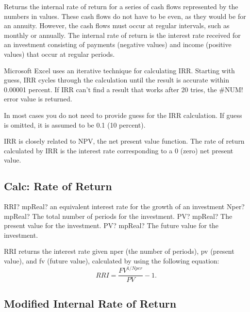 \vspace{0.3cm}
Returns the internal rate of return for a series of cash flows represented by the numbers in values. These cash flows do not have to be even, as they would be for an annuity. However, the cash flows must occur at regular intervals, such as monthly or annually. The internal rate of return is the interest rate received for an investment consisting of payments (negative values) and income (positive values) that occur at regular periods.

Microsoft Excel uses an iterative technique for calculating IRR. Starting with guess, IRR cycles through the calculation until the result is accurate within 0.00001 percent. If IRR can't find a result that works after 20 tries, the \#NUM! error value is returned.

In most cases you do not need to provide guess for the IRR calculation. If guess is omitted, it is assumed to be 0.1 (10 percent).


IRR is closely related to NPV, the net present value function. The rate of return calculated by IRR is the interest rate corresponding to a 0 (zero) net present value.


\subsection{Calc: Rate of Return}

\begin{mpFunctionsExtract}
	\mpWorksheetFunctionThreeNotImplemented
	{RRI? mpReal? an equivalent interest rate for the growth of an investment}
	{Nper? mpReal? The total number of periods for the investment.}
	{PV? mpReal? The present value for the investment.}
	{PV? mpReal? The future value for the investment.}
\end{mpFunctionsExtract}


\vspace{0.3cm}
RRI returns the interest rate given nper (the number of periods), pv (present value), and fv (future value), calculated by using the following equation:
\begin{equation}
	RRI = \frac{FV^{1/Nper}}{PV}-1.
\end{equation}




\subsection{Modified Internal Rate of Return}


